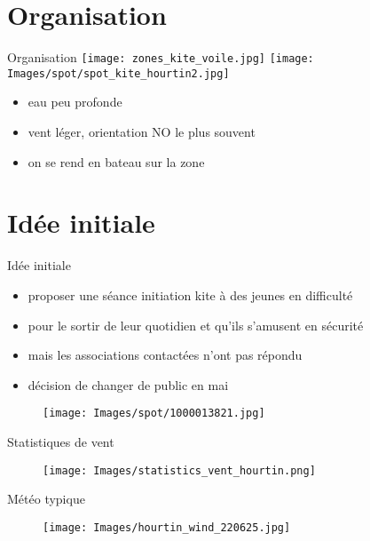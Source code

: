 \documentclass[10pt,a4paper]{beamer}
\begin{document}
\section{Organisation}
\begin{frame}{Organisation}
\texttt{[image: zones\_kite\_voile.jpg]} 
\texttt{[image: Images/spot/spot\_kite\_hourtin2.jpg]} 
\begin{itemize}
\item eau peu profonde
\item vent léger, orientation NO le plus souvent
\item on se rend en bateau sur la zone
\end{itemize}
\end{frame}

\section{Idée initiale}
\begin{frame}{Idée initiale}
\begin{itemize}
\item proposer une séance initiation kite à des jeunes en difficulté
\item pour le sortir de leur quotidien et qu'ils s'amusent en sécurité
\item mais les associations contactées n'ont pas répondu
\item décision de changer de public en mai
\end{itemize}
\begin{figure}
\texttt{[image: Images/spot/1000013821.jpg]} 
\end{figure}
\end{frame}

\begin{frame}{Statistiques de vent}
\begin{figure}
\texttt{[image: Images/statistics\_vent\_hourtin.png]} 
\end{figure}
\end{frame}
\begin{frame}{Météo typique}
\begin{figure}
\texttt{[image: Images/hourtin\_wind\_220625.jpg]} 
\end{figure}
\end{frame}
\end{document}
